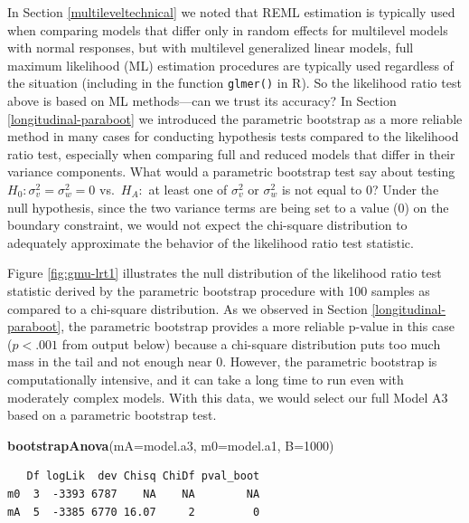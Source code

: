 \documentclass[
]{krantz}
\newenvironment{Shaded}{\begin{snugshade}}{\end{snugshade}}
\newcommand{\AttributeTok}[1]{\textcolor[rgb]{0.27,0.27,0.27}{#1}}
\newcommand{\DecValTok}[1]{\textcolor[rgb]{0.06,0.06,0.06}{#1}}
\newcommand{\FunctionTok}[1]{\textcolor[rgb]{0.27,0.27,0.27}{\textbf{#1}}}
\newcommand{\NormalTok}[1]{#1}
\begin{document}
In Section \ref{multileveltechnical} we noted that REML estimation is typically used when comparing models that differ only in random effects for multilevel models with normal responses, but with multilevel generalized linear models, full maximum likelihood (ML) estimation procedures are typically used regardless of the situation (including in the function \texttt{glmer()} in R). So the likelihood ratio test above is based on ML methods---can we trust its accuracy? In Section \ref{longitudinal-paraboot} we introduced the parametric bootstrap  as a more reliable method in many cases for conducting hypothesis tests compared to the likelihood ratio test, especially when comparing full and reduced models that differ in their variance components. What would a parametric bootstrap test say about testing \(H_{0}: \sigma_{v}^{2}=\sigma_{w}^{2}=0\) vs.~\(H_{A}:\) at least one of \(\sigma_{v}^{2}\) or \(\sigma_{w}^{2}\) is not equal to 0? Under the null hypothesis, since the two variance terms are being set to a value (0) on the boundary constraint, we would not expect the chi-square distribution to adequately approximate the behavior of the likelihood ratio test statistic.

Figure \ref{fig:gmu-lrt1} illustrates the null distribution of the likelihood ratio test statistic derived by the parametric bootstrap procedure with 100 samples as compared to a chi-square distribution. As we observed in Section \ref{longitudinal-paraboot}, the parametric bootstrap provides a more reliable p-value in this case (\(p<.001\) from output below) because a chi-square distribution puts too much mass in the tail and not enough near 0. However, the parametric bootstrap is computationally intensive, and it can take a long time to run even with moderately complex models. With this data, we would select our full Model A3 based on a parametric bootstrap test.

\begin{Shaded}
\begin{Highlighting}[]
\FunctionTok{bootstrapAnova}\NormalTok{(}\AttributeTok{mA=}\NormalTok{model.a3, }\AttributeTok{m0=}\NormalTok{model.a1, }\AttributeTok{B=}\DecValTok{1000}\NormalTok{)}
\end{Highlighting}
\end{Shaded}

\begin{verbatim}
   Df logLik  dev Chisq ChiDf pval_boot
m0  3  -3393 6787    NA    NA        NA
mA  5  -3385 6770 16.07     2         0
\end{verbatim}
\end{document}
